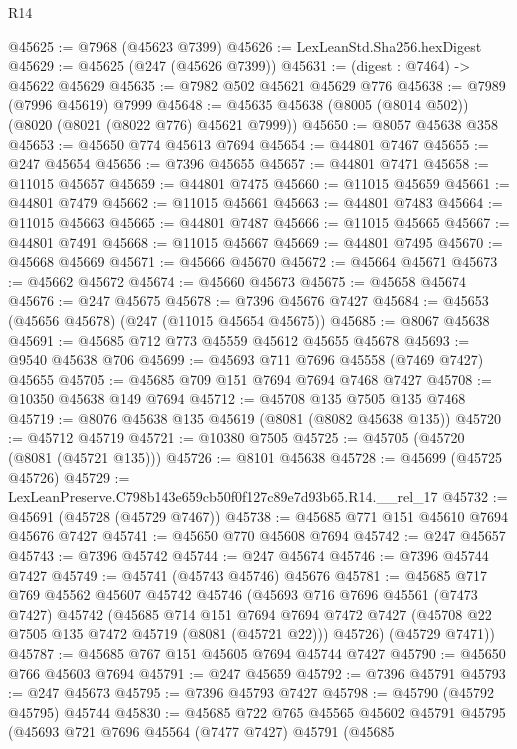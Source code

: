 \begin{lexlean}{R14}
\begin{coremodule}
@45625 := @7968 (@45623 @7399)
@45626 := LexLeanStd.Sha256.hexDigest
@45629 := @45625 (@247 (@45626 @7399))
@45631 := (digest : @7464) -> @45622 @45629
@45635 := @7982 @502 @45621 @45629 @776
@45638 := @7989 (@7996 @45619) @7999
@45648 := @45635 @45638 (@8005 (@8014 @502)) (@8020 (@8021 (@8022 @776) @45621 @7999))
@45650 := @8057 @45638 @358
@45653 := @45650 @774 @45613 @7694
@45654 := @44801 @7467
@45655 := @247 @45654
@45656 := @7396 @45655
@45657 := @44801 @7471
@45658 := @11015 @45657
@45659 := @44801 @7475
@45660 := @11015 @45659
@45661 := @44801 @7479
@45662 := @11015 @45661
@45663 := @44801 @7483
@45664 := @11015 @45663
@45665 := @44801 @7487
@45666 := @11015 @45665
@45667 := @44801 @7491
@45668 := @11015 @45667
@45669 := @44801 @7495
@45670 := @45668 @45669
@45671 := @45666 @45670
@45672 := @45664 @45671
@45673 := @45662 @45672
@45674 := @45660 @45673
@45675 := @45658 @45674
@45676 := @247 @45675
@45678 := @7396 @45676 @7427
@45684 := @45653 (@45656 @45678) (@247 (@11015 @45654 @45675))
@45685 := @8067 @45638
@45691 := @45685 @712 @773 @45559 @45612 @45655 @45678
@45693 := @9540 @45638 @706
@45699 := @45693 @711 @7696 @45558 (@7469 @7427) @45655
@45705 := @45685 @709 @151 @7694 @7694 @7468 @7427
@45708 := @10350 @45638 @149 @7694
@45712 := @45708 @135 @7505 @135 @7468
@45719 := @8076 @45638 @135 @45619 (@8081 (@8082 @45638 @135))
@45720 := @45712 @45719
@45721 := @10380 @7505
@45725 := @45705 (@45720 (@8081 (@45721 @135)))
@45726 := @8101 @45638
@45728 := @45699 (@45725 @45726)
@45729 := LexLeanPreserve.C798b143e659cb50f0f127c89e7d93b65.R14.__rel_17
@45732 := @45691 (@45728 (@45729 @7467))
@45738 := @45685 @771 @151 @45610 @7694 @45676 @7427
@45741 := @45650 @770 @45608 @7694
@45742 := @247 @45657
@45743 := @7396 @45742
@45744 := @247 @45674
@45746 := @7396 @45744 @7427
@45749 := @45741 (@45743 @45746) @45676
@45781 := @45685
    @717
    @769
    @45562
    @45607
    @45742
    @45746
    (@45693
      @716
      @7696
      @45561
      (@7473 @7427)
      @45742
      (@45685
        @714
        @151
        @7694
        @7694
        @7472
        @7427
        (@45708 @22 @7505 @135 @7472 @45719 (@8081 (@45721 @22)))
        @45726)
      (@45729 @7471))
@45787 := @45685 @767 @151 @45605 @7694 @45744 @7427
@45790 := @45650 @766 @45603 @7694
@45791 := @247 @45659
@45792 := @7396 @45791
@45793 := @247 @45673
@45795 := @7396 @45793 @7427
@45798 := @45790 (@45792 @45795) @45744
@45830 := @45685
    @722
    @765
    @45565
    @45602
    @45791
    @45795
    (@45693
      @721
      @7696
      @45564
      (@7477 @7427)
      @45791
      (@45685

\end{coremodule}
\end{lexlean}
